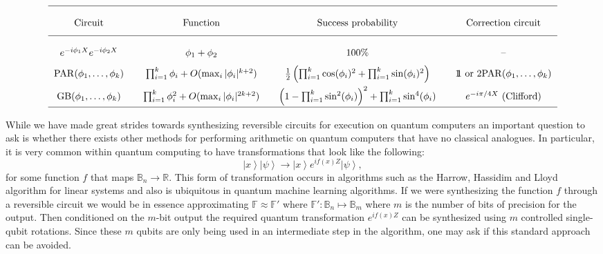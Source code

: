 \documentclass[conference]{IEEEtran}
\newcommand{\fig}[1]{\hyperref[fig:#1]{Figure~\ref*{fig:#1}}}
\newcommand{\openone}{1\!\!1}
\newcommand{\ket}[1]{\left| #1\right\rangle}        %
\begin{document}
\begin{table*}[t!]
\tiny
\[
\begin{tabular}{c@{\qquad}c@{\qquad}c@{\qquad}c}
\hline\\
Circuit & Function & Success probability& Correction circuit\\[1.5ex]
\hline\\
$e^{-i\phi_1 X} e^{-i\phi_2X}$ & $\phi_1+\phi_2$ & $100\%$& --\\[1.5ex]
${\rm PAR}(\phi_1,\ldots,\phi_k)$ & $\prod_{i=1}^k \phi_i + O(\max_i |\phi_i|^{k+2})$&
$\frac{1}{2}\left(\prod_{i=1}^k \cos(\phi_i)^2 + \prod_{i=1}^k \sin(\phi_i)^2\right)$ & $\openone\text{ or } 2{\rm PAR}(\phi_1,\ldots,\phi_k)$\\[1.5ex]
${\rm GB}(\phi_1,\ldots,\phi_k)$ & $\prod_{i=1}^k \phi^2_i + O(\max_i |\phi_i|^{2k+2})$&
$\left(1-\prod_{i=1}^k \sin^2(\phi_i)\right)^2 + \prod_{i=1}^k \sin^4(\phi_i)$ &
$e^{-i\pi/4 X}$ (Clifford)\\[1ex]
\hline
\end{tabular}
\]
\caption{Effective transformations carried out by the circuits in \fig{circuit} for small input rotations.\label{tab:succprob}}
\end{table*}
While we have made great strides towards synthesizing reversible circuits for execution on quantum computers an important question to ask is whether there exists other
methods for performing arithmetic on quantum computers that have no classical analogues.  In particular, it is very common within quantum computing to have transformations
that look like the following:
\begin{equation}
\ket{x}\ket{\psi} \rightarrow \ket{x}e^{if(x)Z}\ket{\psi},\label{eq:target}
\end{equation}
for some function $f$ that maps $\mathbb{B}_{n} \rightarrow \mathbb{R}$.  This form of transformation occurs in algorithms such as the Harrow, Hassidim and Lloyd algorithm for linear systems and also is ubiquitous in quantum machine learning algorithms.  If we were synthesizing the function $f$  through a reversible circuit we would be in essence approximating $\mathbb{F} \approx \mathbb{F}'$ where $\mathbb{F}' : \mathbb{B}_n \mapsto \mathbb{B}_m$ where $m$ is the number of bits of precision for the output.  Then conditioned on the $m$-bit output the required quantum transformation $e^{i f(x)Z}$ can be synthesized using $m$ controlled single-qubit rotations.  Since these $m$ qubits are only being used in an intermediate step in the algorithm, one may ask if this standard approach can be avoided.
\end{document}
